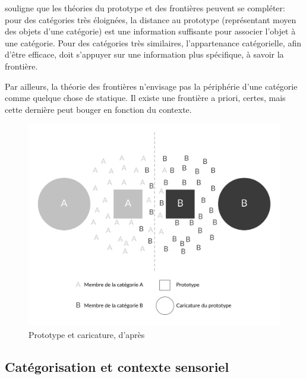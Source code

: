 \citep{goldstone2003concepts} souligne que les théories du prototype et des frontières peuvent se compléter: pour des catégories très éloignées, la distance au prototype (représentant moyen des objets d'une catégorie) est une information suffisante pour associer l'objet à une catégorie. Pour des catégories très similaires, l’appartenance catégorielle, afin d'être efficace, doit s'appuyer sur une information plus spécifique, à savoir la frontière.

Par ailleurs, la théorie des frontières n'envisage pas la périphérie d'une catégorie comme quelque chose de statique. Il existe une frontière a priori, certes, mais cette dernière peut bouger en fonction du contexte.

\begin{figure}[t]
        \myfloatalign
        \includegraphics[width=.8\linewidth]{gfx/prototypeCaricature}
        \caption[Prototype et caricature]{Prototype et caricature, d'après \citep{davis2010memory}}\label{fig:prototypeCaricature}
\end{figure}


\subsection{Catégorisation et contexte sensoriel}
\label{sec:ch3_categoEtContexte}


